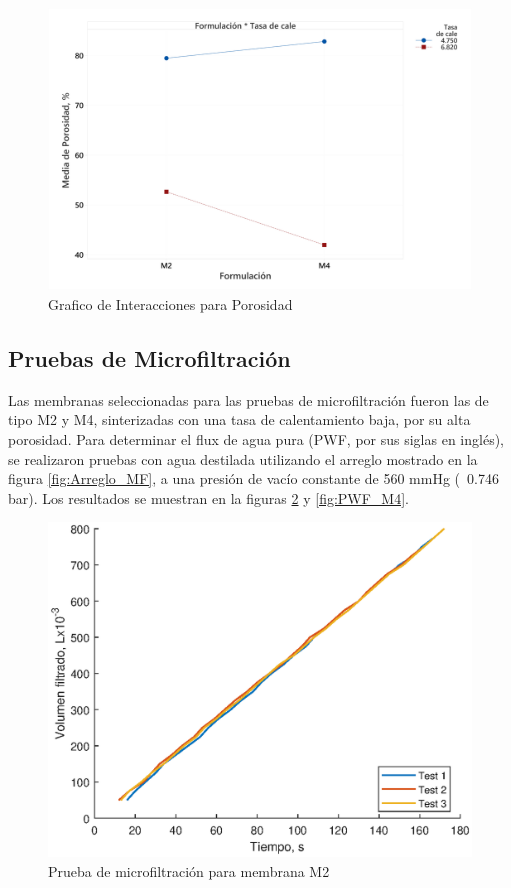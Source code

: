 \documentclass{article}
\begin{document}
\begin{figure}[!htbp]
    \centering
    \includegraphics[width=0.7\linewidth]{Graphics/Grafico de interacciones de Porosidad.png}
    \caption{Grafico de Interacciones para Porosidad}
    \label{fig:InteractPorosidad}
\end{figure}

\subsection{Pruebas de Microfiltración}

Las membranas seleccionadas para las pruebas de microfiltración 
fueron las de tipo M2 y M4, sinterizadas con una tasa de 
calentamiento baja, por su alta porosidad. 
Para determinar el flux de agua pura 
(PWF, por sus siglas en inglés), se realizaron pruebas con 
agua destilada utilizando el arreglo mostrado en la 
figura \ref{fig:Arreglo_MF}, a una presión de vacío constante 
de 560 mmHg (~0.746 bar). Los resultados se muestran en la 
figuras \ref{fig:PWF_M2} y \ref{fig:PWF_M4}. 

\begin{figure}[!htbp]
    \centering
    \includegraphics[width=0.7\linewidth]{Graphics/Z042_PWF_Test.eps}
    \caption{Prueba de microfiltración para membrana M2}
    \label{fig:PWF_M2}
\end{figure}
\end{document}
